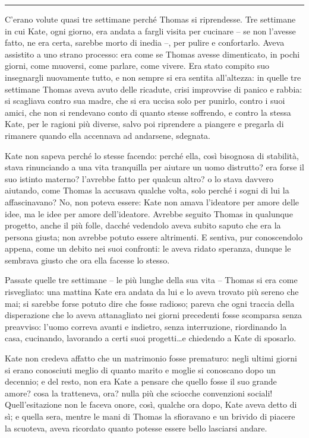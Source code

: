 \plainbreak{1}

C'erano volute quasi tre settimane perché Thomas si riprendesse. Tre settimane in cui Kate, ogni
giorno, era andata a fargli visita per cucinare -- se non l'avesse fatto, ne era certa, sarebbe
morto di inedia --, per pulire e confortarlo. Aveva assistito a uno strano processo: era come se
Thomas avesse dimenticato, in pochi giorni, come muoversi, come parlare, come vivere. Era stato
compito suo insegnargli nuovamente tutto, e non sempre si era sentita all'altezza: in quelle tre
settimane Thomas aveva avuto delle ricadute, crisi improvvise di panico e rabbia: si scagliava
contro sua madre, che si era uccisa solo per punirlo, contro i suoi amici, che non si rendevano
conto di quanto stesse soffrendo, e contro la stessa Kate, per le ragioni più diverse, salvo poi
riprendere a piangere e pregarla di rimanere quando ella accennava ad andarsene, sdegnata.

Kate non sapeva perché lo stesse facendo: perché ella, così bisognosa di stabilità, stava
rinunciando a una vita tranquilla per aiutare un uomo distrutto? era forse il suo istinto materno?
l'avrebbe fatto per qualcun altro? o lo stava davvero aiutando, come Thomas la accusava qualche
volta, solo perché i sogni di lui la affascinavano? No, non poteva essere: Kate non amava l'ideatore
per amore delle idee, ma le idee per amore dell'ideatore. Avrebbe seguito Thomas in qualunque
progetto, anche il più folle, dacché vedendolo aveva subito saputo che era la persona giusta; non
avrebbe potuto essere altrimenti. E sentiva, pur conoscendolo appena, come un debito nei suoi
confronti: le aveva ridato speranza, dunque le sembrava giusto che ora ella facesse lo stesso.

Passate quelle tre settimane -- le più lunghe della sua vita -- Thomas si era come risvegliato: una
mattina Kate era andata da lui e lo aveva trovato più sereno che mai; si sarebbe forse potuto dire
che fosse radioso; pareva che ogni traccia della disperazione che lo aveva attanagliato nei giorni
precedenti fosse scomparsa senza preavviso: l'uomo correva avanti e indietro, senza interruzione,
riordinando la casa, cucinando, lavorando a certi suoi progetti\dots e chiedendo a Kate di sposarlo.

Kate non credeva affatto che un matrimonio fosse prematuro: negli ultimi giorni si erano conosciuti
meglio di quanto marito e moglie si conoscano dopo un decennio; e del resto, non era Kate a pensare
che quello fosse il suo grande amore? cosa la tratteneva, ora? nulla più che sciocche convenzioni
sociali! Quell'esitazione non le faceva onore, così, qualche ora dopo, Kate aveva detto di sì; e
quella sera, mentre le mani di Thomas la sfioravano e un brivido di piacere la scuoteva, aveva
ricordato quanto potesse essere bello lasciarsi andare.
